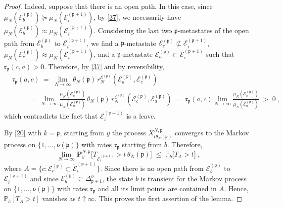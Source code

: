 \documentclass[reqno]{amsart}
\begin{document}
\begin{proof}
Indeed, suppose that there is an open path. In this case, since
$\mu_N({{\mathcal E}}^{({{\mathfrak p}})}_b) \succeq \mu_N({{\mathcal E}}^{({{\mathfrak p}} +1)}_i)$, by
\eqref{37}, we necessarily have $\mu_N({{\mathcal E}}^{({{\mathfrak p}})}_b) \approx
\mu_N({{\mathcal E}}^{({{\mathfrak p}} +1)}_i)$. Considering the last two ${{\mathfrak p}}$-metastates of the open path from ${{\mathcal E}}^{({{\mathfrak p}})}_b$ to ${{\mathcal E}}^{({{\mathfrak p}} +1)}_i$, we find a ${{\mathfrak p}}$-metastate ${{\mathcal E}}^{({{\mathfrak p}})}_c \not
\subset {{\mathcal E}}^{({{\mathfrak p}} +1)}_i$, $\mu_N({{\mathcal E}}^{({{\mathfrak p}})}_c) \approx
\mu_N({{\mathcal E}}^{({{\mathfrak p}} +1)}_i)$, and a ${{\mathfrak p}}$-metastate ${{\mathcal E}}^{({{\mathfrak p}})}_a \subset {{\mathcal E}}^{({{\mathfrak p}} +1)}_i$ such that ${{\mathfrak r}}_{{{\mathfrak p}}}(c,a)>0$. Therefore, by \eqref{37} and by reversibility,
\begin{equation*}
\begin{split}
& {{\mathfrak r}}_{{{\mathfrak p}}}(a,c) \;=\; \lim_{N\to\infty} \theta_N({{\mathfrak p}})\,
r^{{{\mathcal E}}^{({{\mathfrak p}})}}_N ({{\mathcal E}}^{({{\mathfrak p}})}_a , {{\mathcal E}}^{({{\mathfrak p}})}_c) \\
&\qquad \;=\; \lim_{N\to\infty} 
\frac{\mu_N({{\mathcal E}}^{({{\mathfrak p}})}_c)}{\mu_N({{\mathcal E}}^{({{\mathfrak p}})}_a)}\,
\theta_N({{\mathfrak p}})\, r^{{{\mathcal E}}^{({{\mathfrak p}})}}_N ({{\mathcal E}}^{({{\mathfrak p}})}_c , 
{{\mathcal E}}^{({{\mathfrak p}})}_a) \;=\; {{\mathfrak r}}_{{{\mathfrak p}}}(a,c) 
\lim_{N\to\infty} 
\frac{\mu_N({{\mathcal E}}^{({{\mathfrak p}})}_c)}{\mu_N({{\mathcal E}}^{({{\mathfrak p}})}_a)} \;>\; 0\;,   
\end{split}
\end{equation*}
which contradicts the fact that ${{\mathcal E}}^{({{\mathfrak p}} +1)}_i$ is a leave.

By \eqref{20} with $k={{\mathfrak p}}$, starting from $y$ the process $X^{N,{{\mathfrak p}}}_{t\theta_N({{\mathfrak p}})}$ converges to the Markov process on $\{1,
\dots, \nu({{\mathfrak p}})\}$ with rates ${{\mathfrak r}}_{{{\mathfrak p}}}$ starting from
$b$. Therefore,
\begin{equation*}
\lim_{N\to\infty} {{\mathbf P}}^{N, {{\mathfrak p}}}_y \big[ T_{\breve{{{\mathcal E}}}^{({{\mathfrak p}} +1)}_i} > 
t\,\theta_N({{\mathfrak p}})  \big] \;\le \; {{\mathbb P}}_b \big[ T_{A} > t \big]\;,
\end{equation*}
where $A = \{c : {{\mathcal E}}^{({{\mathfrak p}})}_c \subset \breve{{{\mathcal E}}}^{({{\mathfrak p}}
  +1)}_i\}$. Since there is no open path from ${{\mathcal E}}^{({{\mathfrak p}})}_b$ to
${{\mathcal E}}^{({{\mathfrak p}} +1)}_i$ and since ${{\mathcal E}}^{({{\mathfrak p}})}_b\subset
\Delta^o_{{{\mathfrak p}}+1}$, the state $b$ is transient for the Markov process
on $\{1, \dots, \nu({{\mathfrak p}})\}$ with rates ${{\mathfrak r}}_{{{\mathfrak p}}}$ and all its
limit points are contained in $A$. Hence, ${{\mathbb P}}_b [ T_{A} > t ]$
vanishes as $t\uparrow\infty$. This proves the first assertion of the
lemma.


\end{proof}
\end{document}
